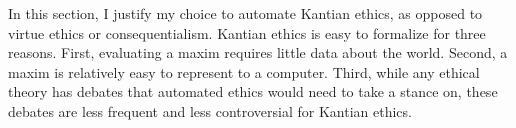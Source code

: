 %
\begin{isabellebody}%
%
%
\isadelimtheory
%
\endisadelimtheory
%
\isatagtheory
%
\endisatagtheory
{\isafoldtheory}%
%
\isadelimtheory
%
\endisadelimtheory
%
\isadelimdocument
%
\endisadelimdocument
%
\isatagdocument
%
\isamarkuptrue%
%
\endisatagdocument
{\isafolddocument}%
%
\isadelimdocument
%
\endisadelimdocument
%
\begin{isamarkuptext}%
In this section, I justify my choice to automate Kantian ethics, as opposed to virtue ethics or
consequentialism. Kantian ethics is easy to formalize for three reasons. First, evaluating a maxim requires little 
data about the world. Second, a maxim is relatively easy to represent to a computer. Third, while 
any ethical theory has debates that automated ethics would need to take a stance on, these debates are 
less frequent and less controversial for Kantian ethics. 


\end{isamarkuptext}
\end{isabellebody}
